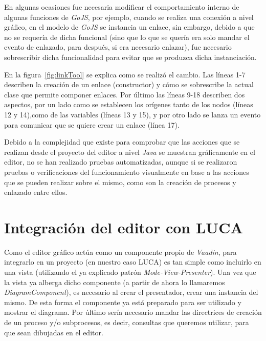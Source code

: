 En algunas ocasiones fue necesaria  modificar el comportamiento interno de algunas funciones de \emph{GoJS}, por ejemplo, cuando se realiza una conexión a nivel gráfico, en el modelo de \emph{GoJS} se instancia un enlace, sin embargo, debido a que no se requería de dicha funcional (sino que lo que se quería era solo mandar el evento de enlazado, para después, si era necesario enlazar), fue necesario sobrescribir dicha funcionalidad para evitar que se produzca dicha instanciación. 

En la figura~\ref{fig:linkTool} se explica como se realizó el cambio. Las líneas 1-7 describen la creación de un enlace (constructor) y cómo se sobrescribe la actual clase que permite componer enlaces. Por último las líneas 9-18 describen dos aspectos, por un lado como se establecen los orígenes tanto de los nodos (líneas 12 y 14),como de las variables (líneas 13 y 15), y por otro lado se lanza un evento para comunicar que se quiere crear un enlace (línea 17).




Debido a la complejidad que existe para comprobar que las acciones que se realizan desde el proyecto del editor a nivel \emph{Java} se muestran gráficamente en el editor, no se han realizado pruebas automatizadas, aunque si se realizaron pruebas o verificaciones del funcionamiento visualmente en base a las acciones que se pueden realizar sobre el mismo, como son la creación de procesos y enlazado entre ellos.


\section{Integración del editor con LUCA}

Como el editor gráfico actúa como un componente propio de \emph{Vaadin}, para integrarlo en un proyecto (en nuestro caso LUCA) es tan simple como incluirlo en una vista (utilizando el ya explicado patrón \emph{Mode-View-Presenter}). Una vez que la vista ya alberga dicho componente (a partir de ahora lo llamaremos \emph{DiagramComponent}), es necesario al crear el presentador, crear una instancia del mismo. De esta forma el componente ya está preparado para ser utilizado y mostrar el diagrama. Por último sería necesario mandar las directrices de creación de un proceso y/o subprocesos, es decir, consultas que queremos utilizar, para que sean dibujadas en el editor.

